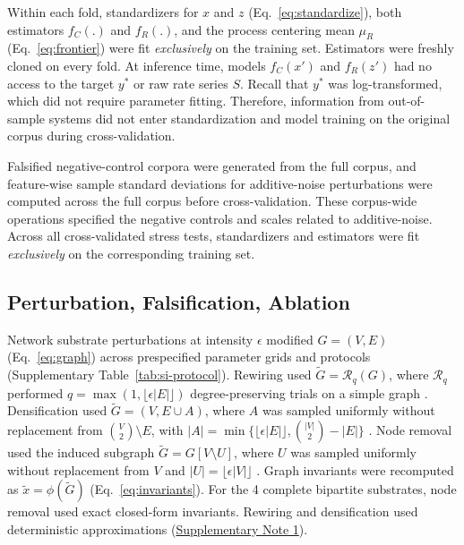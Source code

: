 \documentclass{article}
\begin{document}
Within each fold, standardizers for $x$ and $z$ (Eq.~\eqref{eq:standardize}), both estimators $f_C(.)$ and $f_R(.)$, and the process centering mean $\mu_R$ (Eq.~\eqref{eq:frontier}) were fit \textit{exclusively} on the training set. Estimators were freshly cloned on every fold. At inference time, models $f_C(x')$ and $f_R(z')$ had no access to the target $y^*$ or raw rate series $S$. Recall that $y^*$ was log-transformed, which did not require parameter fitting. Therefore, information from out-of-sample systems did not enter standardization and model training on the original corpus during cross-validation.

Falsified negative-control corpora were generated from the full corpus, and feature-wise sample standard deviations for additive-noise perturbations were computed across the full corpus before cross-validation. These corpus-wide operations specified the negative controls and scales related to additive-noise. Across all cross-validated stress tests, standardizers and estimators were fit \textit{exclusively} on the corresponding training set.

\subsection*{Perturbation, Falsification, Ablation}
\label{sec:stress}
Network substrate perturbations at intensity $\epsilon$ modified $G = (V, E)$ (Eq.~\eqref{eq:graph}) across prespecified parameter grids and protocols (Supplementary Table~\ref{tab:si-protocol}). Rewiring used $\widetilde{G} = \mathcal{R}_q(G)$, where $\mathcal{R}_q$ performed $q = \max(1, \lfloor \epsilon\lvert E \rvert \rfloor)$ degree-preserving trials on a simple graph \citep{ref56}. Densification used $\widetilde{G} = (V, E \cup A)$, where $A$ was sampled uniformly without replacement from $\binom{V}{2} \setminus E$, with $\lvert A \rvert = \min\{\lfloor \epsilon\lvert E \rvert \rfloor, \binom{\lvert V \rvert}{2} - \lvert E \rvert\}$ \citep{ref106}. Node removal used the induced subgraph $\widetilde{G} = G[V \setminus U]$, where $U$ was sampled uniformly without replacement from $V$ and $\lvert U \rvert = \lfloor \epsilon\lvert V \rvert \rfloor$ \citep{ref104,ref105}. Graph invariants were recomputed as $\widetilde{x} = \phi(\widetilde{G})$ (Eq.~\eqref{eq:invariants}). For the 4 complete bipartite substrates, node removal used exact closed-form invariants. Rewiring and densification used deterministic approximations (\hyperref[sec:si-note-bipartite]{Supplementary Note 1}).
\end{document}
